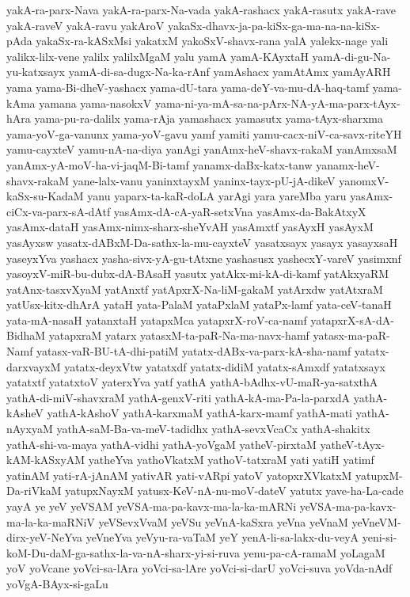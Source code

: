 {yakA-ra-parx-Nava
yakA-ra-parx-Na-vada
yakA-rashacx
yakA-rasutx
yakA-rave
yakA-raveV
yakA-ravu
yakAroV
yakaSx-dhavx-ja-pa-kiSx-ga-ma-na-na-kiSx-pAda
yakaSx-ra-kASxMsi
yakatxM
yakoSxV-shavx-rana
yalA
yalekx-nage
yali
yalikx-lilx-vene
yalilx
yalilxMgaM
yalu
yamA
yamA-KAyxtaH
yamA-di-gu-Na-yu-katxsayx
yamA-di-sa-dugx-Na-ka-rAnf
yamAshacx
yamAtAmx
yamAyARH
yama
yama-Bi-dheV-yashacx
yama-dU-tara
yama-deY-va-mu-dA-haq-tamf
yama-kAma
yamana
yama-nasokxV
yama-ni-ya-mA-sa-na-pArx-NA-yA-ma-parx-tAyx-hAra
yama-pu-ra-dalilx
yama-rAja
yamashacx
yamasutx
yama-tAyx-sharxma
yama-yoV-ga-vanunx
yama-yoV-gavu
yamf
yamiti
yamu-cacx-niV-ca-savx-riteYH
yamu-cayxteV
yamu-nA-na-diya
yanAgi
yanAmx-heV-shavx-rakaM
yanAmxsaM
yanAmx-yA-moV-ha-vi-jaqM-Bi-tamf
yanamx-daBx-katx-tanw
yanamx-heV-shavx-rakaM
yane-lalx-vanu
yaninxtayxM
yaninx-tayx-pU-jA-dikeV
yanomxV-kaSx-su-KadaM
yanu
yaparx-ta-kaR-doLA
yarAgi
yara
yareMba
yaru
yasAmx-ciCx-va-parx-sA-dAtf
yasAmx-dA-cA-yaR-setxVna
yasAmx-da-BakAtxyX
yasAmx-dataH
yasAmx-nimx-sharx-sheYvAH
yasAmxtf
yasAyxH
yasAyxM
yasAyxsw
yasatx-dABxM-Da-sathx-la-mu-cayxteV
yasatxsayx
yasayx
yasayxsaH
yaseyxYva
yashacx
yasha-sivx-yA-gu-tAtxne
yashasusx
yashecxY-vareV
yasimxnf
yasoyxV-miR-bu-dubx-dA-BAsaH
yasutx
yatAkx-mi-kA-di-kamf
yatAkxyaRM
yatAnx-tasxvXyaM
yatAnxtf
yatApxrX-Na-liM-gakaM
yatArxdw
yatAtxraM
yatUsx-kitx-dhArA
yataH
yata-PalaM
yataPxlaM
yataPx-lamf
yata-ceV-tanaH
yata-mA-nasaH
yatanxtaH
yatapxMca
yatapxrX-roV-ca-namf
yatapxrX-sA-dA-BidhaM
yatapxraM
yatarx
yatasxM-ta-paR-Na-ma-navx-hamf
yatasx-ma-paR-Namf
yatasx-vaR-BU-tA-dhi-patiM
yatatx-dABx-va-parx-kA-sha-namf
yatatx-darxvayxM
yatatx-deyxVtw
yatatxdf
yatatx-didiM
yatatx-sAmxdf
yatatxsayx
yatatxtf
yatatxtoV
yaterxYva
yatf
yathA
yathA-bAdhx-vU-maR-ya-satxthA
yathA-di-miV-shavxraM
yathA-genxV-riti
yathA-kA-ma-Pa-la-parxdA
yathA-kAsheV
yathA-kAshoV
yathA-karxmaM
yathA-karx-mamf
yathA-mati
yathA-nAyxyaM
yathA-saM-Ba-va-meV-tadidhx
yathA-sevxVcaCx
yathA-shakitx
yathA-shi-va-maya
yathA-vidhi
yathA-yoVgaM
yatheV-pirxtaM
yatheV-tAyx-kAM-kASxyAM
yatheYva
yathoVkatxM
yathoV-tatxraM
yati
yatiH
yatimf
yatinAM
yati-rA-jAnAM
yativAR
yati-vARpi
yatoV
yatopxrXVkatxM
yatupxM-Da-riVkaM
yatupxNayxM
yatusx-KeV-nA-nu-moV-dateV
yatutx
yave-ha-La-cade
yayA
ye
yeV
yeVSAM
yeVSA-ma-pa-kavx-ma-la-ka-mARNi
yeVSA-ma-pa-kavx-ma-la-ka-maRNiV
yeVSevxVvaM
yeVSu
yeVnA-kaSxra
yeVna
yeVnaM
yeVneVM-dirx-yeV-NeYva
yeVneYva
yeVyu-ra-vaTaM
yeY
yenA-li-sa-lakx-du-veyA
yeni-si-koM-Du-daM-ga-sathx-la-va-nA-sharx-yi-si-ruva
yenu-pa-cA-ramaM
yoLagaM
yoV
yoVcane
yoVci-sa-lAra
yoVci-sa-lAre
yoVci-si-darU
yoVci-suva
yoVda-nAdf
yoVgA-BAyx-si-gaLu
}

